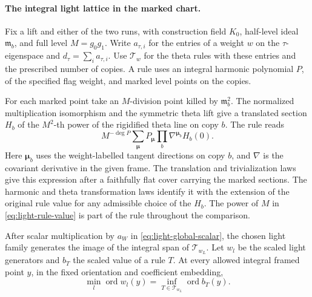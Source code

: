 \paragraph{The integral light lattice in the marked chart.}
\label{par:slice-light-integral}
Fix a lift and either of the two runs, with construction field
\(K_0\), half-level ideal \(\mathfrak m_b\), and full level
\(M=g_0g_1\). Write \(a_{\tau,i}\) for the entries of a weight
\(w\) on the \(\tau\)-eigenspace and \(d_\tau=\sum_i a_{\tau,i}\).
Use \(\mathcal T_w\) for the theta rules with these entries and
the prescribed number of copies. A rule uses an integral harmonic
polynomial \(P\), of the specified flag weight, and marked level
points on the copies.

For each marked point take an \(M\)-division
point killed by \(\mathfrak m_b^2\). The normalized multiplication
isomorphism and the symmetric theta lift give a translated section
\(H_b\) of the \(M^2\)-th power of the rigidified theta line on
copy \(b\). The rule reads
\begin{equation}\label{eq:light-rule-value}
 M^{-\deg P}\sum_{\boldsymbol\mu} P_{\boldsymbol\mu}
        \prod_b \nabla^{\boldsymbol\mu_b} H_b(0).
\end{equation}
Here \(\boldsymbol\mu_b\) uses the weight-labelled tangent
directions on copy \(b\), and \(\nabla\) is the covariant
derivative in the given frame. The translation and trivialization
laws give this expression after a faithfully flat cover carrying
the marked sections. The harmonic and theta transformation laws
identify it with the extension of the original rule value for
any admissible choice of the \(H_b\). The power of \(M\) in
\eqref{eq:light-rule-value} is part of the rule throughout the
comparison. \label{cor:slice-light-integral-1}

\begin{proposition}
\label{prop:scaled-integral-light-reading}
After scalar multiplication by \(a_W\) in \eqref{eq:light-global-scalar},
the chosen light family generates the image of the integral span
of \(\mathcal T_{w_L}\). Let \(w_l\) be the scaled light generators and \(b_T\) the scaled value of a rule \(T\). At every allowed integral framed point \(y\), in the fixed orientation and coefficient embedding,
\[
 \min_l\operatorname{ord}w_l(y)=\inf_{T\in\mathcal T_{w_L}}\operatorname{ord}b_T(y).
\]

\end{proposition}

